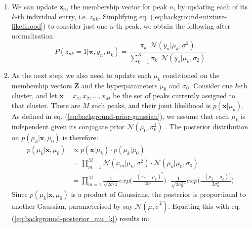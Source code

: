 \begin{enumerate}

\item We can update $\boldsymbol{z}_n$, the membership vector for peak $n$, by updating each of its $k$-th individual entry, i.e. $z_{nk}$. Simplifying eq. (\ref{eq:background-mixture-likelihood}) to consider just one $n$-th peak, we obtain the following after normalisation:
\begin{equation}
P(z_{nk}=1 \vert \boldsymbol{\pi}, y_n, \mu_k) = \frac{\pi_k \enspace \mathcal{N}(y_n \vert \mu_k, \sigma^2)}{\sum_{k=1}^K \pi_k \enspace \mathcal{N}(y_n \vert \mu_k, \sigma_2)}
\label{eq:background-mixture-conditional-z}
\end{equation}

\item As the next step, we also need to update each $\mu_k$ conditioned on the membership vectors $\boldsymbol{Z}$ and the hyperparameters $\mu_0$ and $\sigma_0$. Consider one $k$-th cluster, and let $\boldsymbol{x}={x_1,x_2,...,x_M}$ be the set of peaks currently assigned to that cluster. There are $M$ such peaks, and their joint likelihood is $p(\boldsymbol{x} \vert \mu_k)$. As defined in eq. (\ref{eq:background-prior-gaussian}), we assume that each $\mu_k$ is independent given its conjugate prior $\mathcal{N}(\mu_0, \sigma_0^2)$ . The posterior distribution on $p(\mu_k \vert \boldsymbol{x}, \mu_0)$ is therefore:
\begin{equation}
\begin{aligned}
p(\mu_k \vert \boldsymbol{x}, \mu_0) &\propto p(\boldsymbol{x} \vert \mu_k) \cdot p(\mu_k \vert \mu_0) \\
                                                           &= \prod_{m=1}^{M} \mathcal{N}(x_m \vert \mu_k, \sigma^2) \cdot \mathcal{N}(\mu_k \vert \mu_0, \sigma_0) \\
                                                           &= \prod_{m=1}^{M} \frac{1}{\sqrt{2\sigma^2\pi}} exp\bigg(\frac{-(x_n-\mu_k)^2}{2\sigma^2} \bigg) \cdot \frac{1}{\sqrt{2\sigma_0^2\pi}} exp\bigg(\frac{-(\mu_k-\mu_0)^2}{2\sigma_0^2} \bigg)
\end{aligned}                                                           
\label{eq:background-posterior_mu_k}
\end{equation}
Since $p(\mu_k \vert \boldsymbol{x}, \mu_0)$ is a product of Gaussians, the posterior is proportional to another Gaussian, parameterised by say $\mathcal{N}(\tilde{\mu}, \tilde{\sigma}^2)$. Equating this with eq. (\ref{eq:background-posterior_mu_k}) results in:

\end{enumerate}
